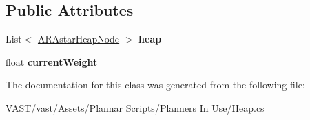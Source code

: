 \subsection*{Public Attributes}
\begin{DoxyCompactItemize}
\item 
\hypertarget{class_a_r_astar_heap_ae0f2f230149af325a9ee9865b0254a64}{List$<$ \hyperlink{class_a_r_astar_heap_node}{A\-R\-Astar\-Heap\-Node} $>$ {\bfseries heap}}\label{class_a_r_astar_heap_ae0f2f230149af325a9ee9865b0254a64}

\item 
\hypertarget{class_a_r_astar_heap_a2e92991656c5366efe99143fd372ee94}{float {\bfseries current\-Weight}}\label{class_a_r_astar_heap_a2e92991656c5366efe99143fd372ee94}

\end{DoxyCompactItemize}


The documentation for this class was generated from the following file\-:\begin{DoxyCompactItemize}
\item 
V\-A\-S\-T/vast/\-Assets/\-Plannar Scripts/\-Planners In Use/Heap.\-cs\end{DoxyCompactItemize}
